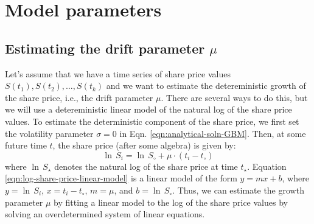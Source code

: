 \documentclass[11pt]{article}
\theoremstyle{definition}
\begin{document}
\section*{Model parameters}
\subsection*{Estimating the drift parameter $\mu$}
Let's assume that we have a time series of share price values $S(t_{1}), S(t_{2}), \dots, S(t_{k})$ and we want to estimate the detereministic growth of the share price, i.e., the drift parameter $\mu$.
There are several ways to do this, but we will use a detereministic linear model of the natural log of the share price values.
To estimate the deterministic component of the share price, we first set the volatility parameter $\sigma = 0$ in Eqn. \ref{eqn:analytical-soln-GBM}.
Then, at some future time $t$, the share price (after some algebra) is given by:
\begin{equation}\label{eqn:log-share-price-linear-model}
\ln\,S_{i} = \ln\,S_{\circ} + \mu\cdot\left(t_{i}-t_{\circ}\right)
\end{equation}
where $\ln\,S_{\star}$ denotes the natural log of the share price at time $t_{\star}$.
Equation \ref{eqn:log-share-price-linear-model} is a linear model of the form $y = mx + b$, where $y = \ln\,S_{i}$, $x = t_{i}-t_{\circ}$, $m = \mu$, and $b = \ln\,S_{\circ}$.
Thus, we can estimate the growth parameter $\mu$ by fitting a linear model to the log of the share price values by solving an overdetermined system of linear equations.
\end{document}
